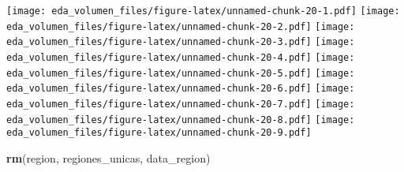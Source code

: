 \documentclass[
]{article}
\newenvironment{Shaded}{\begin{snugshade}}{\end{snugshade}}
\newcommand{\AttributeTok}[1]{\textcolor[rgb]{0.13,0.29,0.53}{#1}}
\newcommand{\CommentTok}[1]{\textcolor[rgb]{0.56,0.35,0.01}{\textit{#1}}}
\newcommand{\ConstantTok}[1]{\textcolor[rgb]{0.56,0.35,0.01}{#1}}
\newcommand{\ControlFlowTok}[1]{\textcolor[rgb]{0.13,0.29,0.53}{\textbf{#1}}}
\newcommand{\DecValTok}[1]{\textcolor[rgb]{0.00,0.00,0.81}{#1}}
\newcommand{\FunctionTok}[1]{\textcolor[rgb]{0.13,0.29,0.53}{\textbf{#1}}}
\newcommand{\NormalTok}[1]{#1}
\newcommand{\OtherTok}[1]{\textcolor[rgb]{0.56,0.35,0.01}{#1}}
\newcommand{\SpecialCharTok}[1]{\textcolor[rgb]{0.81,0.36,0.00}{\textbf{#1}}}
\begin{document}
\begin{Shaded}
\end{Shaded}

\texttt{[image: eda\_volumen\_files/figure-latex/unnamed-chunk-20-1.pdf]}
\texttt{[image: eda\_volumen\_files/figure-latex/unnamed-chunk-20-2.pdf]}
\texttt{[image: eda\_volumen\_files/figure-latex/unnamed-chunk-20-3.pdf]}
\texttt{[image: eda\_volumen\_files/figure-latex/unnamed-chunk-20-4.pdf]}
\texttt{[image: eda\_volumen\_files/figure-latex/unnamed-chunk-20-5.pdf]}
\texttt{[image: eda\_volumen\_files/figure-latex/unnamed-chunk-20-6.pdf]}
\texttt{[image: eda\_volumen\_files/figure-latex/unnamed-chunk-20-7.pdf]}
\texttt{[image: eda\_volumen\_files/figure-latex/unnamed-chunk-20-8.pdf]}
\texttt{[image: eda\_volumen\_files/figure-latex/unnamed-chunk-20-9.pdf]}

\begin{Shaded}
\begin{Highlighting}[]
\FunctionTok{rm}\NormalTok{(region, regiones\_unicas, data\_region)}
\end{Highlighting}
\end{Shaded}
\end{document}
